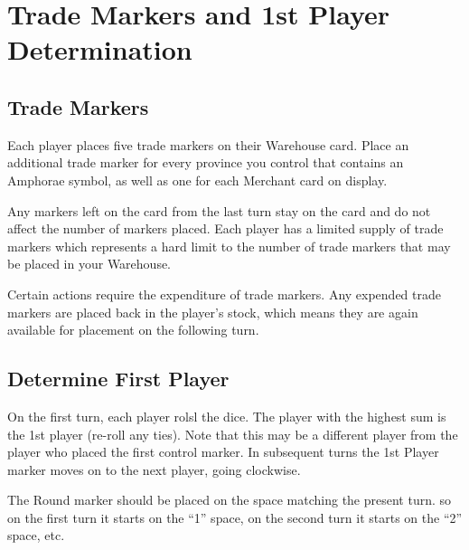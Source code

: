 \section{Trade Markers and 1st Player Determination}

\subsection{Trade Markers}

Each player places five trade markers on their Warehouse card. Place an additional trade marker for every province you control that contains an Amphorae symbol, as well as one for each Merchant card on display.

Any markers left on the card from the last turn stay on the card and do not affect the number of markers placed. Each player has a limited supply of trade markers which represents a hard limit to the number of trade markers that may be placed in your Warehouse.

Certain actions require the expenditure of trade markers. Any expended trade markers are placed back in the player’s stock, which means they are again available for placement on the following turn.

\subsection{Determine First Player}

On the first turn, each player rolsl the dice. The player with the highest sum is the 1st player (re-roll any ties). Note that this may be a different player from the player who placed the first control marker. In subsequent turns the 1st Player marker moves on to the next player, going clockwise.

The Round marker should be placed on the space matching the present turn. so on the first turn it starts on the “1” space, on the second turn it starts on the “2” space, etc.